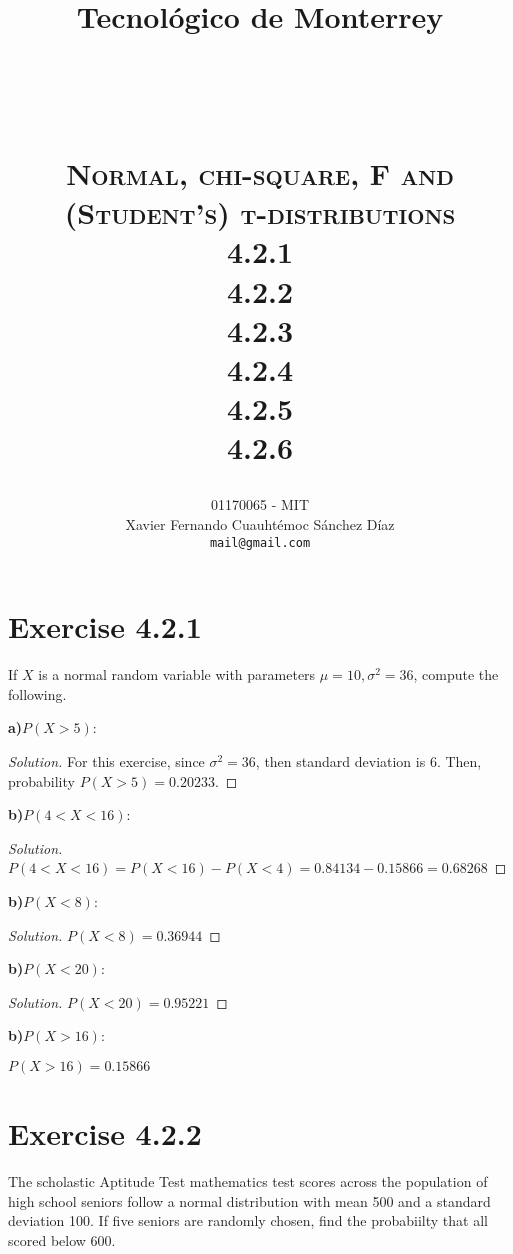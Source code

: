 \documentclass[titlepage, letterpaper, fleqn]{article}
\title{
\vspace{1in}
\textbf{Tecnológico de Monterrey} \\
\vspace{0.5in}
\textmd{\mahclass} \\
\large{\textit{\mahteacher}} \\
\vspace{0.5in}
\textsc{\mahtitle}\\
\textsc{Normal, chi-square, F and (Student's) t-distributions}\\
\textsc{4.2.1}\\
\textsc{4.2.2}\\
\textsc{4.2.3}\\
\textsc{4.2.4}\\
\textsc{4.2.5}\\
\textsc{4.2.6}\\
\author{01170065  - MIT \\
Xavier Fernando Cuauhtémoc Sánchez Díaz \\
\texttt{mail@gmail.com}}
\date{\mahdate}
}
\newcommand{\spacepls}{\vspace{5mm}}
\renewcommand\qedsymbol{\(\blacksquare\)}
\newenvironment{solution}
{\renewcommand\qedsymbol{$\square$}\begin{proof}[Solution]}
{\end{proof}}
\begin{document}
\begin{titlepage}
\maketitle
\end{titlepage}

%
%

\section{Exercise 4.2.1}

{\large If $X$ is a normal random variable with parameters $\mu = 10, \sigma^2 = 36$, compute the following.

\textbf{a)}$P(X > 5)$:}

\begin{solution}
For this exercise, since $\sigma^2 = 36$, then standard deviation is 6.
Then, probability $P(X > 5)= 0.20233$.
\end{solution}

\spacepls

{\large \textbf{b)}$P(4 < X < 16)$:}

\begin{solution}
$P(4 < X < 16)= P(X < 16) - P(X < 4) = 0.84134 - 0.15866 = 0.68268$
\end{solution}

\spacepls

{\large \textbf{b)}$P(X < 8)$:}

\begin{solution}
$P(X < 8) = 0.36944$
\end{solution}

\spacepls

{\large \textbf{b)}$P(X < 20)$:}

\begin{solution}
$P(X < 20) = 0.95221$
\end{solution}

\spacepls

{\large \textbf{b)}$P(X > 16)$:}

$P(X > 16) = 0.15866$

\spacepls

\section{Exercise 4.2.2}

{\large The scholastic Aptitude Test mathematics test scores across the population of high school seniors follow a normal distribution with mean 500 and a standard deviation 100.
If five seniors are randomly chosen, find the probabiilty that all scored below 600.}
\end{document}
